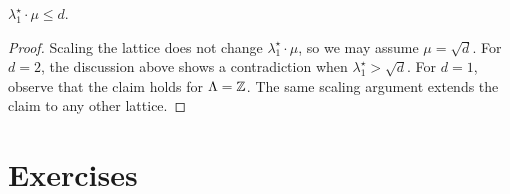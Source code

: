 \begin{theorem}
  $\lambda_1^\star \cdot \mu \leq d$.
\end{theorem}
\begin{proof}
  Scaling the lattice does not change $\lambda_1^\star \cdot \mu$,
  so we may assume $\mu = \sqrt{d}$.
  For $d = 2$, the discussion above shows a contradiction when $\lambda_1^\star > \sqrt{d}$.
  For $d = 1$, observe that the claim holds for $\Lambda = \mathbb{Z}$.
  The same scaling argument extends the claim to any other lattice.
\end{proof}










\section*{Exercises}

